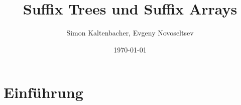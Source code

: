\documentclass{beamer}
\begin{document}
\title{Suffix Trees und Suffix Arrays}  
\author{Simon Kaltenbacher, Evgeny Novoseltsev}
\date{\today}


\frame{\titlepage}




\section{Einführung}
\end{document}
